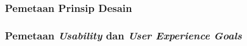 \subsubsection{Pemetaan Prinsip Desain}


\subsubsection{Pemetaan \textit{Usability} dan \textit{User Experience Goals}}









